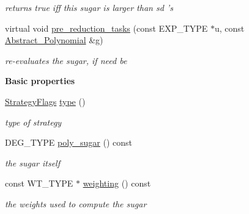 \begin{DoxyCompactItemize}
\begin{DoxyCompactList}\small\item\em returns {\ttfamily true} iff {\ttfamily this} sugar is larger than {\ttfamily sd} 's \end{DoxyCompactList}\item 
virtual void \hyperlink{group__strategygroup_a4a34039eb50a2294d2aaf6245c1833b8}{pre\+\_\+reduction\+\_\+tasks} (const E\+X\+P\+\_\+\+T\+Y\+PE $\ast$u, const \hyperlink{group__polygroup_class_abstract___polynomial}{Abstract\+\_\+\+Polynomial} \&g)
\begin{DoxyCompactList}\small\item\em re-\/evaluates the sugar, if need be \end{DoxyCompactList}\end{DoxyCompactItemize}
\begin{Indent}\textbf{ Basic properties}\par
\begin{DoxyCompactItemize}
\item 
\mbox{\label{group__strategygroup_a472c39541209b6738cb497ebc3c9e205}} 
\hyperlink{group__strategygroup_ga0ee6c8e033547330e6b89929730007f4}{Strategy\+Flags} \hyperlink{group__strategygroup_a472c39541209b6738cb497ebc3c9e205}{type} ()
\begin{DoxyCompactList}\small\item\em type of strategy \end{DoxyCompactList}\item 
\mbox{\label{group__strategygroup_a2d369a1ab46cf990413f190f22203a3d}} 
D\+E\+G\+\_\+\+T\+Y\+PE \hyperlink{group__strategygroup_a2d369a1ab46cf990413f190f22203a3d}{poly\+\_\+sugar} () const
\begin{DoxyCompactList}\small\item\em the sugar itself \end{DoxyCompactList}\item 
\mbox{\label{group__strategygroup_a0ac423ed3a00a9b7e71dc8103116c82c}} 
const W\+T\+\_\+\+T\+Y\+PE $\ast$ \hyperlink{group__strategygroup_a0ac423ed3a00a9b7e71dc8103116c82c}{weighting} () const
\begin{DoxyCompactList}\small\item\em the weights used to compute the sugar \end{DoxyCompactList}\end{DoxyCompactItemize}
\end{Indent}
